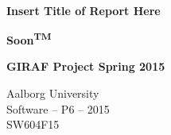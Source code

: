 
\begin{center}

	\vspace*{\fill}

	\hrulefill\newline \\

	\begin{LARGE}	
		\textbf{Insert Title of Report Here}
	\end{LARGE}

	\vspace{0.6cm}

	\begin{Large}
		\textbf{Soon\textsuperscript{TM}}
	\end{Large}

	\vspace{1cm}

	\begin{large} 
		\textbf{GIRAF Project Spring 2015}
	\end{large}

	\hrulefill\newline

	Aalborg University		\\
	Software -- P6 -- 2015	\\
	SW604F15				\\
    
	\vspace*{\fill}

\end{center}
\thispagestyle{empty}